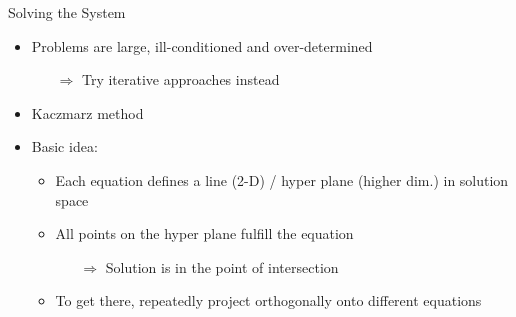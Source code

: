 \begin{frame}[c]{Solving the System}


	\begin{itemize}
		\setlength\itemsep{0.3cm}
		\item Problems are large, ill-conditioned and over-determined
		      \begin{itemize}
			      \item[$\Rightarrow$] Try iterative approaches instead
		      \end{itemize}
	\end{itemize}
	\vspace{1cm}

	\begin{itemize}
		\item Kaczmarz method
		\item Basic idea:
		      \begin{itemize}
			      \item Each equation defines a line (2-D) / hyper plane (higher dim.) in solution space
			      \item All points on the hyper plane fulfill the equation
			            \begin{itemize}
				            \item[$\Rightarrow$] Solution is in the point of intersection
			            \end{itemize}
			      \item To get there, repeatedly project orthogonally onto different equations
		      \end{itemize}

	\end{itemize}

\end{frame}

